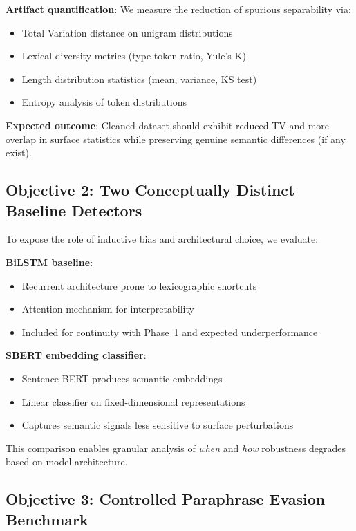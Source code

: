 \documentclass[conference]{IEEEtran}
\begin{document}
\textbf{Artifact quantification}: We measure the reduction of spurious separability via:
\begin{itemize}
    \item Total Variation distance on unigram distributions
    \item Lexical diversity metrics (type-token ratio, Yule's K)
    \item Length distribution statistics (mean, variance, KS test)
    \item Entropy analysis of token distributions
\end{itemize}

\textbf{Expected outcome}: Cleaned dataset should exhibit reduced TV and more overlap in surface statistics while preserving genuine semantic differences (if any exist).

\subsection{Objective 2: Two Conceptually Distinct Baseline Detectors}

To expose the role of inductive bias and architectural choice, we evaluate:

\textbf{BiLSTM baseline}: 
\begin{itemize}
    \item Recurrent architecture prone to lexicographic shortcuts
    \item Attention mechanism for interpretability
    \item Included for continuity with Phase~1 and expected underperformance
\end{itemize}

\textbf{SBERT embedding classifier}:
\begin{itemize}
    \item Sentence-BERT \cite{reimers2019sentence} produces semantic embeddings
    \item Linear classifier on fixed-dimensional representations
    \item Captures semantic signals less sensitive to surface perturbations
\end{itemize}

This comparison enables granular analysis of \emph{when} and \emph{how} robustness degrades based on model architecture.

\subsection{Objective 3: Controlled Paraphrase Evasion Benchmark}
\end{document}
